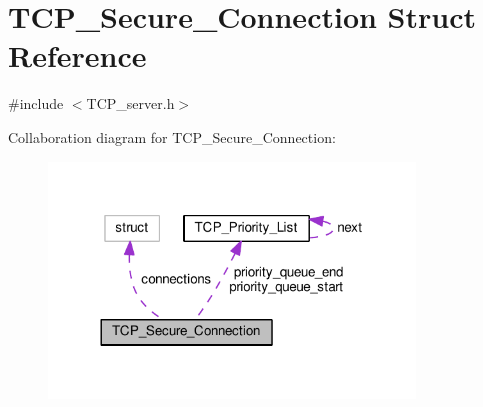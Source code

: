 \hypertarget{struct_t_c_p___secure___connection}{\section{T\+C\+P\+\_\+\+Secure\+\_\+\+Connection Struct Reference}
\label{struct_t_c_p___secure___connection}
}


{\ttfamily \#include $<$T\+C\+P\+\_\+server.\+h$>$}



Collaboration diagram for T\+C\+P\+\_\+\+Secure\+\_\+\+Connection\+:
\nopagebreak
\begin{figure}[H]
\begin{center}
\leavevmode
\includegraphics[width=276pt]{d2/d11/struct_t_c_p___secure___connection__coll__graph}
\end{center}
\end{figure}
